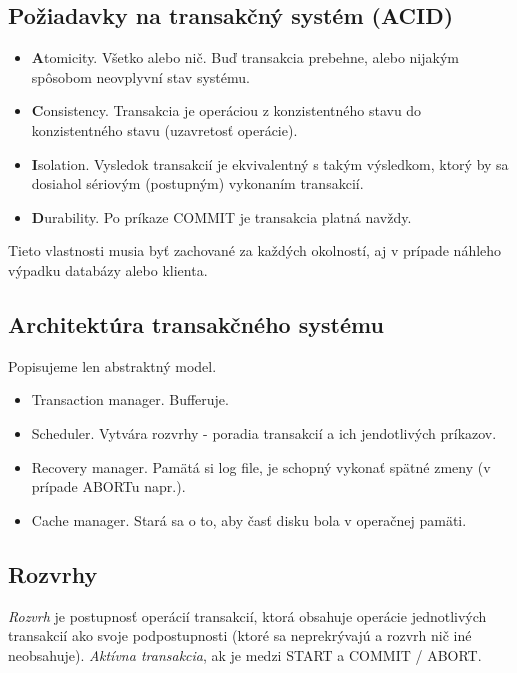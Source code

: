 \documentclass[10pt,a4paper]{article}
\begin{document}
\subsection{Požiadavky na transakčný systém (ACID)}

\begin{itemize}
\item {\bf A}tomicity. Všetko alebo nič. Buď transakcia prebehne, alebo nijakým spôsobom neovplyvní stav systému. 
\item {\bf C}onsistency. Transakcia je operáciou z konzistentného stavu do konzistentného stavu (uzavretosť operácie). 
\item {\bf I}solation. Vysledok transakcií je ekvivalentný s takým výsledkom, ktorý by sa dosiahol sériovým (postupným) vykonaním transakcií. 
\item {\bf D}urability. Po príkaze COMMIT je transakcia platná navždy. 
\end{itemize}

Tieto vlastnosti musia byť zachované za každých okolností, aj v prípade náhleho výpadku databázy alebo klienta. 

\subsection{Architektúra transakčného systému}

Popisujeme len abstraktný model. 

\begin{itemize}
\item Transaction manager. Bufferuje. 
\item Scheduler. Vytvára rozvrhy - poradia transakcií a ich jendotlivých príkazov. 
\item Recovery manager. Pamätá si log file, je schopný vykonať spätné zmeny (v prípade ABORTu napr.).
\item Cache manager. Stará sa o to, aby časť disku bola v operačnej pamäti.  
\end{itemize}

\subsection{Rozvrhy}

\emph{Rozvrh} je postupnosť operácií transakcií, ktorá obsahuje operácie jednotlivých transakcií ako svoje podpostupnosti (ktoré sa neprekrývajú a rozvrh nič iné neobsahuje). 
\emph{Aktívna transakcia}, ak je medzi START a COMMIT / ABORT. 
\end{document}
